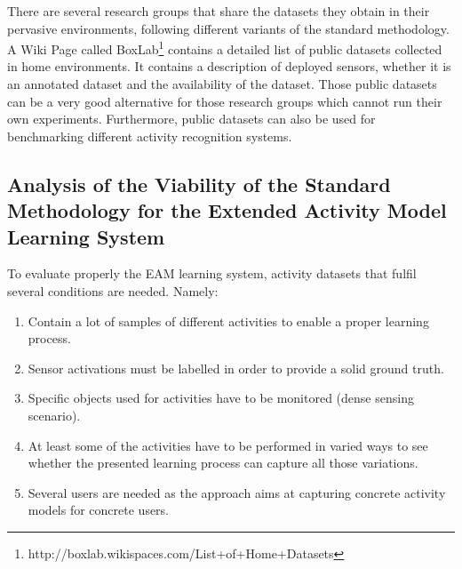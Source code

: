 There are several research groups that share the datasets they obtain in their pervasive environments, following different variants of the standard methodology. A Wiki Page called BoxLab\footnote{http://boxlab.wikispaces.com/List+of+Home+Datasets} contains a detailed list of public datasets collected in home environments. It contains a description of deployed sensors, whether it is an annotated dataset and the availability of the dataset. Those public datasets can be a very good alternative for those research groups which cannot run their own experiments. Furthermore, public datasets can also be used for benchmarking different activity recognition systems.



\subsection{Analysis of the Viability of the Standard Methodology for the Extended Activity Model Learning System}

To evaluate properly the EAM learning system, activity datasets that fulfil several conditions are needed. Namely:

\begin{enumerate}
 \item Contain a lot of samples of different activities to enable a proper learning process.
 \item Sensor activations must be labelled in order to provide a solid ground truth.
 \item Specific objects used for activities have to be monitored (dense sensing scenario).
 \item At least some of the activities have to be performed in varied ways to see whether the presented learning process can capture all those variations.
 \item Several users are needed as the approach aims at capturing concrete activity models for concrete users. 
\end{enumerate}

